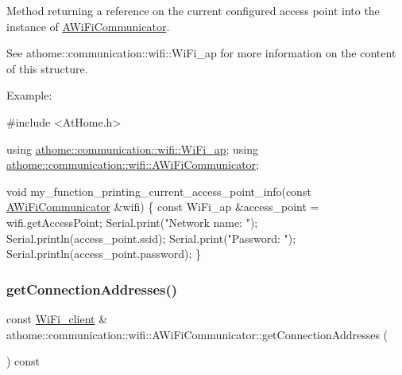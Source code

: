 Method returning a reference on the current configured access point into the instance of \mbox{\hyperlink{classathome_1_1communication_1_1wifi_1_1_a_wi_fi_communicator}{A\+Wi\+Fi\+Communicator}}.

See athome\+::communication\+::wifi\+::\+Wi\+Fi\+\_\+ap for more information on the content of this structure.

Example\+:


\begin{DoxyCode}
\textcolor{preprocessor}{#include <AtHome.h>}

\textcolor{keyword}{using} \mbox{\hyperlink{structathome_1_1communication_1_1wifi_1_1s__wifi__access__point}{athome::communication::wifi::WiFi\_ap}};
\textcolor{keyword}{using} \mbox{\hyperlink{classathome_1_1communication_1_1wifi_1_1_a_wi_fi_communicator}{athome::communication::wifi::AWiFiCommunicator}};

\textcolor{keywordtype}{void} my\_function\_printing\_current\_access\_point\_info(\textcolor{keyword}{const} \mbox{\hyperlink{classathome_1_1communication_1_1wifi_1_1_a_wi_fi_communicator_a0098148fe8d0eeee99b7f8f72a72a900}{AWiFiCommunicator}} &wifi) \{
  \textcolor{keyword}{const} WiFi\_ap &access\_point = wifi.getAccessPoint;
  Serial.print(\textcolor{stringliteral}{"Network name: "});
  Serial.println(access\_point.ssid);
  Serial.print(\textcolor{stringliteral}{"Password: "});
  Serial.println(access\_point.password);
\}
\end{DoxyCode}
 \mbox{\label{classathome_1_1communication_1_1wifi_1_1_a_wi_fi_communicator_afcc41f462a12c8348148c915dcafd1a0}} 
\subsubsection{\texorpdfstring{get\+Connection\+Addresses()}{getConnectionAddresses()}}
{\footnotesize\ttfamily const \mbox{\hyperlink{structathome_1_1communication_1_1wifi_1_1s__wifi__client}{Wi\+Fi\+\_\+client}} \& athome\+::communication\+::wifi\+::\+A\+Wi\+Fi\+Communicator\+::get\+Connection\+Addresses (\begin{DoxyParamCaption}{ }\end{DoxyParamCaption}) const}

